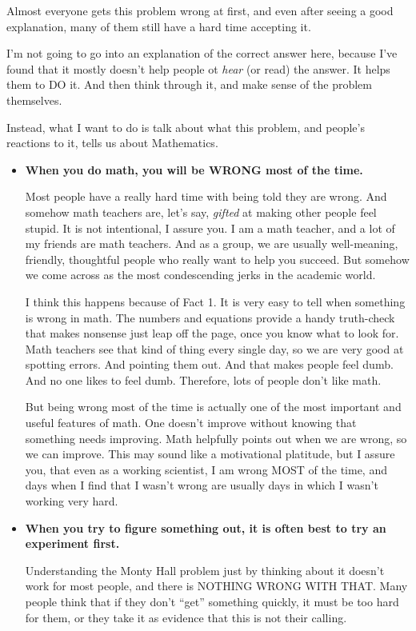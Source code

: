 Almost everyone gets this problem wrong at first, and even after
seeing a good explanation, many of them still have a hard time
accepting it.


I'm not going to go into an explanation of the correct answer here,
because I've found that it mostly doesn't help people ot \emph{hear}
(or read) the answer.  It helps them to DO it.  And then think through
it, and make sense of the problem themselves.


Instead, what I want to do is talk about what this problem, and
people's reactions to it, tells us about Mathematics.

\begin{itemize}
\item \textbf{When you do math, you will be WRONG most of the time.}

Most people have a really hard time with being told they are wrong.
And somehow math teachers are, let's say, \emph{gifted} at making
other people feel stupid.  It is not intentional, I assure you.  I am
a math teacher, and a lot of my friends are math teachers.  And as a
group, we are usually well-meaning, friendly, thoughtful people who
really want to help you succeed.  But somehow we come across as the
most condescending jerks in the academic world.


I think this happens because of Fact 1.  It is very easy to tell when
something is wrong in math.  The numbers and equations provide a handy
truth-check that makes nonsense just leap off the page, once you know
what to look for.  Math teachers see that kind of thing every single
day, so we are very good at spotting errors.  And pointing them out.
And that makes people feel dumb.  And no one likes to feel dumb.
Therefore, lots of people don't like math.


But being wrong most of the time is actually one of the most important
and useful features of math.  One doesn't improve without knowing that
something needs improving.  Math helpfully points out when we are
wrong, so we can improve.  This may sound like a motivational
platitude, but I assure you, that even as a working scientist, I am
wrong MOST of the time, and days when I find that I wasn't wrong are
usually days in which I wasn't working very hard.


\item \textbf{When you try to figure something out, it is often best
  to try an experiment first.}


Understanding the Monty Hall problem just by thinking about it doesn't
work for most people, and there is NOTHING WRONG WITH THAT.  Many
people think that if they don't ``get'' something quickly, it must be
too hard for them, or they take it as evidence that this is not their
calling.  



\end{itemize}
